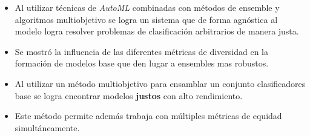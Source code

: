 \begin{conclusions}
\begin{itemize}
    \item Al utilizar técnicas de \emph{AutoML} combinadas con métodos de ensemble y algoritmos multiobjetivo se logra un sistema que de forma agnóstica al modelo logra resolver problemas de clasificación arbitrarios de manera justa.
    \item Se mostró la influencia de las diferentes métricas de diversidad en la formación de modelos base que den lugar a ensembles mas robustos.
    \item Al utilizar un método multiobjetivo para ensamblar un conjunto clasificadores base se logra encontrar modelos \textbf{justos} con alto rendimiento.
    \item Este método permite además trabaja con múltiples métricas de equidad simultáneamente.
\end{itemize}

\end{conclusions}